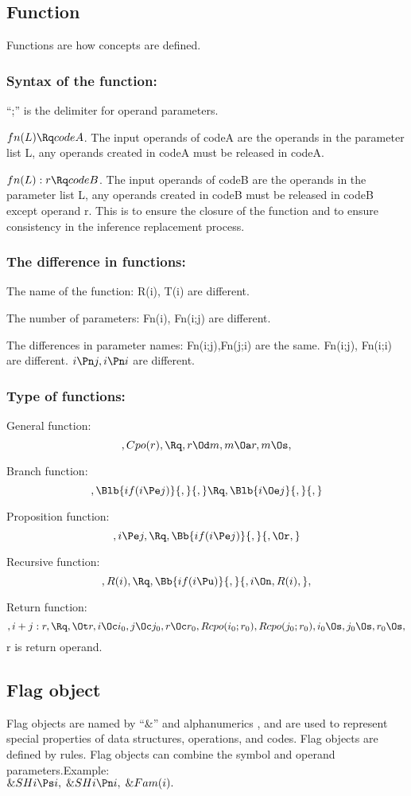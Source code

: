 \subsection{Function}

Functions are how concepts are defined.

\subsubsection{Syntax of the function:}
“;” is the delimiter for operand parameters.

\( fn(L) \Rq codeA\). The input operands of codeA are the operands in the parameter list L, any operands created in codeA must be released in codeA.
  
\( fn(L):r \Rq codeB\). The input operands of codeB are the operands in the parameter list L, any operands created in codeB must be released in codeB except operand r. This is to ensure the closure of the function and to ensure consistency in the inference replacement process.

\subsubsection{The difference in functions:}

The name of the function: R(i), T(i) are different.
	

The number of parameters: Fn(i), Fn(i;j) are different.


The differences in parameter names:  Fn(i;j),Fn(j;i) are the same. Fn(i;j), Fn(i;i) are different. \( i \Pn j, i \Pn i\) are different.

\subsubsection{Type of functions:}
General function:
\[,Cpo(r), \Rq , r \Od m, m \Oa r, m \Os,\]

Branch function:
\[,\Blb{if(i \Pe j)}{,}{,} \Rq ,\Blb{i \Oe j}{,}{,}\]

Proposition function:
\[,i \Pe j, \Rq , \Bb{if(i \Pe j)}{,}{, \Or,}\]

Recursive function:
\[, R(i), \Rq , \Bb{if(i \Pu)}{,}{, i \On, R(i),}, \]

Return function:
\[, i +j:r, \Rq , \Ot r, i \Oc i_0, j \Oc j_0, r \Oc r_0, Rcpo(i_0;r_0), Rcpo(j_0;r_0), i_0 \Os, j_0 \Os, r_0 \Os, \]
r is return operand.



\subsection{Flag object}
Flag objects are named by “\&” and alphanumerics , and are used to represent special properties of data structures, operations, and codes. Flag objects are defined by rules. Flag objects can combine the symbol and operand parameters.Example:\\
\( \&SHi \Ps i, \; \&SHi \Pn i, \; \&Fam(i).\)



